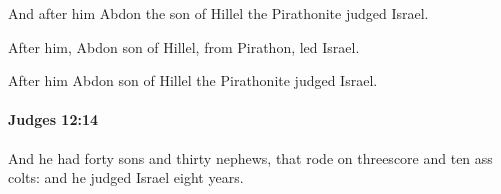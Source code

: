 			\begin{versebox}
					\item[BHS] 
					\item[ASV] And after him Abdon the son of Hillel the Pirathonite judged Israel.
					\item[NIV] After him, Abdon son of Hillel, from Pirathon, led Israel.
					\item[NRSV] After him Abdon son of Hillel the Pirathonite judged Israel.
			\end{versebox}

		\paragraph{Judges 12:14} %
			\label{JUDGES-12-14}

			And he had forty sons and thirty nephews, that rode on threescore and ten ass colts: and he judged Israel eight years.

